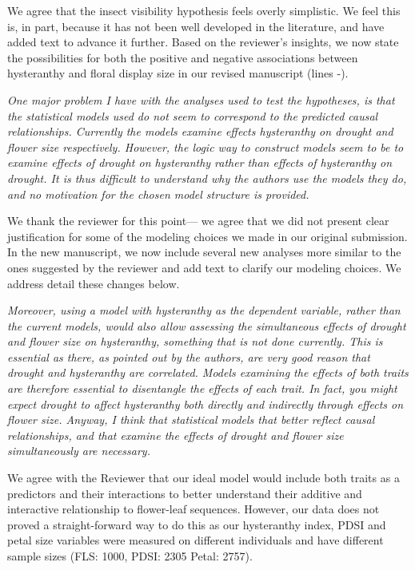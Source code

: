 \documentclass{article}[12pt]
\begin{document}
We agree that the insect visibility hypothesis feels overly simplistic. We feel this is, in part, because it has not been well developed in the literature, and have added text to advance it further. Based on the reviewer's insights, we now state the possibilities for both the positive and negative associations between hysteranthy and floral display size in our revised manuscript (lines -). 

\emph{One major problem I have with the analyses used to test the hypotheses, is that the statistical models used do not seem to correspond to the predicted causal relationships. Currently the models examine effects hysteranthy on drought and flower size respectively. However, the logic way to construct models seem to be to examine effects of drought on hysteranthy rather than effects of hysteranthy on drought. It is thus difficult to understand why the authors use the models they do, and no motivation for the chosen model structure is provided.}

We thank the reviewer for this point--- we agree that we did not present clear justification for some of the modeling choices we made in our original submission. In the new manuscript, we now include several new analyses more similar to the ones suggested by the reviewer and add text to clarify our modeling choices. We address detail these changes below.

\emph{Moreover, using a model with hysteranthy as the dependent variable, rather than the current models, would also allow assessing the simultaneous effects of drought and flower size on hysteranthy, something that is not done currently. This is essential as there, as pointed out by the authors, are very good reason that drought and hysteranthy are correlated. Models examining the effects of both traits are therefore essential to disentangle the effects of each trait. In fact, you might expect drought to affect hysteranthy both directly and indirectly through effects on flower size. Anyway, I think that statistical models that better reflect causal relationships, and that examine the effects of drought and flower size simultaneously are necessary.}

We agree with the Reviewer that our ideal model would include both traits as a predictors and their interactions to better understand their additive and interactive relationship to flower-leaf sequences. However, our data does not proved a straight-forward way to do this as our hysteranthy index, PDSI and petal size variables were measured on different individuals and have different sample sizes (FLS: 1000, PDSI: 2305 Petal: 2757).
\end{document}
